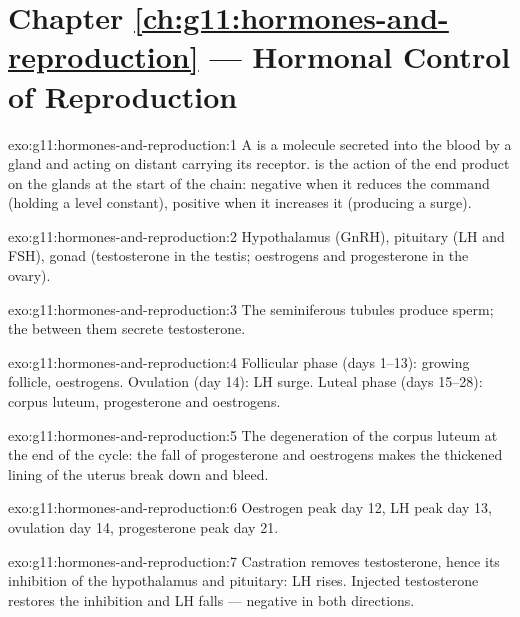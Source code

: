 \section*{Chapter \ref{ch:g11:hormones-and-reproduction} --- Hormonal Control of Reproduction}

\begin{solution}{exo:g11:hormones-and-reproduction:1}
A  is a molecule secreted into the blood by a gland and acting
on distant  carrying its receptor.  is the action of the
end product on the glands at the start of the chain: negative when it
reduces the command (holding a level constant), positive when it
increases it (producing a surge).
\end{solution}

\begin{solution}{exo:g11:hormones-and-reproduction:2}
Hypothalamus (GnRH), pituitary (LH and FSH), gonad (testosterone in
the testis; oestrogens and progesterone in the ovary).
\end{solution}

\begin{solution}{exo:g11:hormones-and-reproduction:3}
The seminiferous tubules produce sperm; the  between them
secrete testosterone.
\end{solution}

\begin{solution}{exo:g11:hormones-and-reproduction:4}
Follicular phase (days 1--13): growing follicle, oestrogens.
Ovulation (day 14): LH surge. Luteal phase (days 15--28): corpus
luteum, progesterone and oestrogens.
\end{solution}

\begin{solution}{exo:g11:hormones-and-reproduction:5}
The degeneration of the corpus luteum at the end of the cycle: the
fall of progesterone and oestrogens makes the thickened lining of the
uterus break down and bleed.
\end{solution}

\begin{solution}{exo:g11:hormones-and-reproduction:6}
Oestrogen peak day 12, LH peak day 13, ovulation day 14, progesterone
peak day 21.
\end{solution}

\begin{solution}{exo:g11:hormones-and-reproduction:7}
Castration removes testosterone, hence its inhibition of the
hypothalamus and pituitary: LH rises. Injected testosterone restores
the inhibition and LH falls --- negative  in both directions.
\end{solution}

